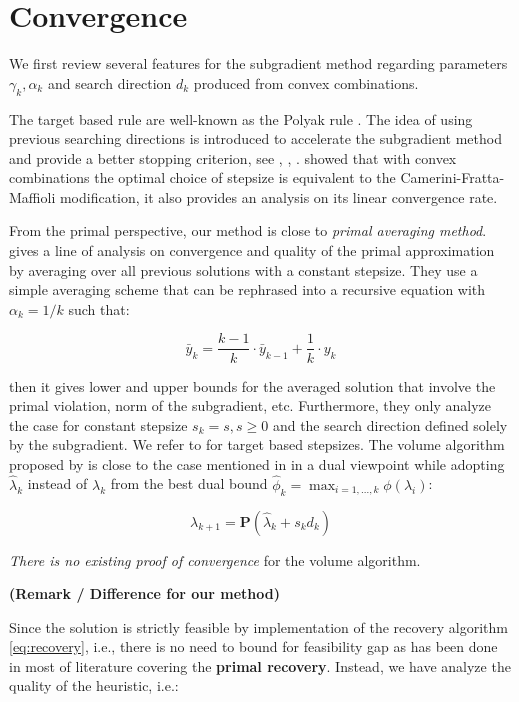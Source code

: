 \hypertarget{convergence}{%
  \section{Convergence}\label{convergence}}


We first review several features for the subgradient method regarding
parameters \(\gamma_k, \alpha_k\) and search direction \(d_k\) produced from convex combinations.

The target based rule are well-known as the Polyak rule \cite{polyak_general_1967}.
The idea of using previous searching directions is introduced to accelerate the subgradient method and provide a better stopping criterion,
see \cite{camerini1975improving}, \cite{brannlund1995generalized}, \cite{barahona_volume_2000}.
\cite{brannlund1995generalized} showed that with convex combinations the optimal choice of stepsize is
equivalent to the Camerini-Fratta-Maffioli modification, it also provides an analysis on its linear convergence rate.

From the primal perspective, our method is close to \emph{primal
  averaging method}. \cite{nedic_approximate_2009}
gives a line of analysis on convergence and quality of the primal
approximation by averaging over all previous solutions with a constant
stepsize. They use a simple averaging scheme that can be rephrased into a
recursive equation with \(\alpha_k = 1/k\) such that:

\[\bar y_k = \frac{k-1}{k}\cdot\bar y_{k-1} + \frac{1}{k} \cdot y_k\]

then it gives lower and upper bounds for the averaged solution
that involve the primal violation, norm of the subgradient, etc. Furthermore, they only analyze the case for constant
stepsize \(s_k = s, s\ge 0\) and the search direction defined solely by
the subgradient. We refer to \cite{kiwiel_lagrangian_2007} for target based
stepsizes. The volume algorithm proposed by \cite{barahona_volume_2000} is close to the
case mentioned in \cite{brannlund1995generalized} in a dual
viewpoint while adopting \(\hat \lambda_{k}\) instead of \(\lambda_k\) from the best dual bound
\(\hat \phi_k = \max_{i=1, ..., k} \phi(\lambda_i)\):

\[\lambda_{k+1} = \mathbf{P}(\hat\lambda_{k} + s_{k}d_{k})\]

\emph{There is no existing proof of convergence} for the volume
algorithm.

\textbf{(Remark / Difference for our method)}

Since the solution is strictly feasible by implementation of the
recovery algorithm \ref{eq:recovery}, i.e., there is no need to bound for feasibility gap
as has been done in most of literature covering the \textbf{primal
  recovery}. Instead, we have analyze the quality of the heuristic, i.e.:

